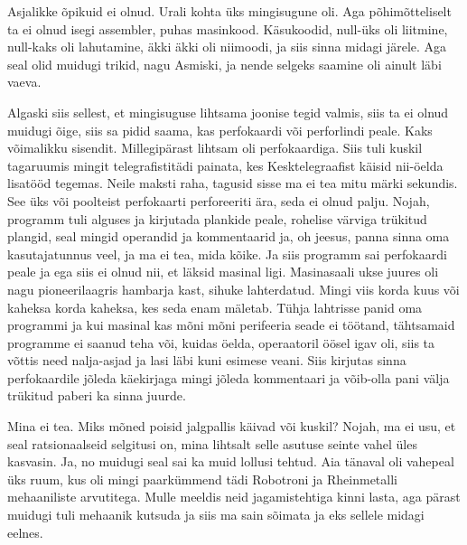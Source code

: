 
Asjalikke õpikuid ei olnud. Urali kohta üks mingisugune oli. Aga põhimõtteliselt ta ei olnud isegi assembler, puhas masinkood. Käsukoodid, null-üks oli liitmine, null-kaks oli lahutamine, äkki äkki oli niimoodi, ja siis sinna midagi järele. Aga seal olid muidugi trikid,  nagu Asmiski, ja nende selgeks saamine oli ainult läbi vaeva. 

Algaski siis sellest, et mingisuguse lihtsama joonise tegid valmis, siis ta ei olnud muidugi õige, siis sa pidid saama, kas perfokaardi või perforlindi peale. Kaks võimalikku sisendit. Millegipärast lihtsam oli perfokaardiga. Siis tuli kuskil tagaruumis mingit telegrafistitädi painata, kes Kesktelegraafist käisid nii-öelda lisatööd tegemas. Neile maksti raha, tagusid sisse ma ei tea mitu  märki sekundis. See üks või poolteist perfokaarti perforeeriti ära, seda ei olnud palju. Nojah, programm tuli alguses ja kirjutada  plankide peale, rohelise värviga trükitud plangid, seal mingid  operandid ja kommentaarid ja, oh jeesus,  panna sinna oma kasutajatunnus veel, ja ma ei tea, mida kõike. Ja siis programm sai perfokaardi peale ja ega siis ei olnud nii, et läksid masinal ligi. Masinasaali ukse juures oli nagu pioneerilaagris hambarja kast, sihuke lahterdatud. Mingi viis korda kuus või kaheksa korda kaheksa, kes seda enam mäletab. Tühja lahtrisse panid oma programmi ja kui masinal kas mõni mõni perifeeria seade ei töötand, tähtsamaid programme ei saanud teha või, kuidas öelda, operaatoril öösel igav oli, siis ta võttis need nalja-asjad ja lasi läbi kuni esimese veani. Siis kirjutas sinna perfokaardile jõleda käekirjaga mingi jõleda kommentaari ja võib-olla pani välja trükitud paberi ka sinna juurde. 


Mina ei tea. Miks mõned poisid jalgpallis käivad või kuskil? Nojah, ma ei usu, et seal ratsionaalseid selgitusi on, mina lihtsalt selle  asutuse seinte vahel üles kasvasin. Ja, no muidugi seal sai ka muid lollusi tehtud. Aia tänaval oli vahepeal üks ruum, kus oli mingi paarkümmend tädi Robotroni ja  Rheinmetalli  mehaaniliste arvutitega. Mulle meeldis neid jagamistehtiga kinni lasta, aga pärast muidugi tuli mehaanik kutsuda ja siis ma sain sõimata ja eks sellele midagi eelnes. 


